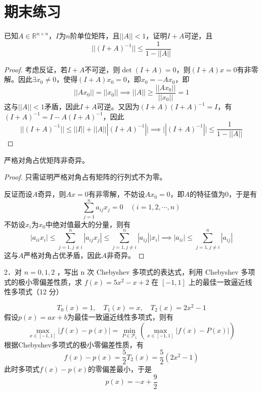 \section{期末练习}

\begin{exercise}
    已知$A\in \mathbb{R}^{n\times n}$，$I$为$n$阶单位矩阵，且$||A||<1$，证明$I+A$可逆，且
    \[
        ||(I+A)^{-1}||\leq \frac{1}{1-||A||}
    \]
\end{exercise}
\begin{proof}
    考虑反证，若$I+A$不可逆，则$\det(I+A)=0$，则$(I+A)x=0$有非零解。因此$\exists x_0\neq 0$，使得$(I+A)x_0=0$，即$x_0=-Ax_0$，即
    \[
        ||Ax_0||=||x_0||\implies ||A||\geq \frac{||Ax_0||}{||x_0||}=1
    \]
    这与$||A||<1$矛盾，因此$I+A$可逆。又因为$(I+A)(I+A)^{-1}=I$，有$(I+A)^{-1}=I-A(I+A)^{-1}$，因此
    \[
        ||(I+A)^{-1}||\leq ||I||+||A|||(I+A)^{-1}||\implies ||(I+A)^{-1}||\leq \frac{1}{1-||A||}
    \]
\end{proof}

\begin{exercise}
    严格对角占优矩阵非奇异。
\end{exercise}
\begin{proof}
    只需证明严格对角占有矩阵的行列式不为零。

    反证而设$A$奇异，则$Ax=0$有非零解，不妨设$Ax_0=0$，即$A$的特征值为0，于是有
    \[
        \sum_{j=1}^n a_{ij}x_j=0 \quad (i=1,2,\cdots,n)
    \]
    不妨设$x_i$为$x_0$中绝对值最大的分量，则有
    \[
        |a_{ii}x_i|\le \sum_{j=1,j\neq i}^n |a_{ij}x_j|\le \sum_{j=1,j\neq i}^n |a_{ij}| |x_i|\implies |a_{ii}|\le \sum_{j=1,j\neq i}^n |a_{ij}|
    \]
    这与$A$严格对角占优矛盾，因此$A$非奇异。
\end{proof}

\begin{exercise}
    2．对 $n=0,1,2$ ，写出 n 次 Chebyshev 多项式的表达式，利用 Chebyshev 多项式的极小零偏差性质，求 $f(x)=5x^2-x+2$ 在 $[-1,1]$ 上的最佳一致逼近线性多项式（12 分）
\end{exercise}
\begin{solution}
    \[
        T_0(x)=1, \quad T_1(x)=x, \quad T_2(x)=2x^2-1
    \]
    假设$p(x)=ax+b$为最佳一致逼近线性多项式，则有
    \[
        \max_{x\in[-1,1]} |f(x)-p(x)|=\min_{P\in \mathcal{P}_1} (\max_{x\in[-1,1]} |f(x)-P(x)|)
    \]
    根据Chebyshev多项式的极小零偏差性质，有
    \[
        f(x)-p(x)=\frac{5}{2}T_2(x)=\frac{5}{2}(2x^2-1)
    \]
    此时多项式$f(x)-p(x)$的零偏差最小，于是
    \[
        p(x)=-x+\frac{9}{2}
    \]
\end{solution}

